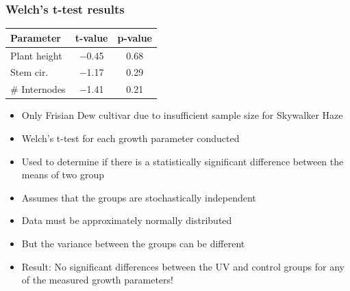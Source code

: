 \documentclass[12pt, aspectratio=1610]{beamer}
\begin{document}
    \begin{frame}
        \frametitle{Welch's t-test results}
        \footnotesize
        \begin{table}
            \begin{tabular}{lcc}
                \hline
                \hline
                \textbf{Parameter} & \textbf{t-value} & \textbf{p-value} \\
                \hline
                \hline
                Plant height & \num[mode=text]{-0.45} & \num[mode=text]{0.68} \\
                Stem cir. & \num[mode=text]{-1.17} & \num[mode=text]{0.29} \\
                \# Internodes & \num[mode=text]{-1.41} & \num[mode=text]{0.21} \\
                \hline
                \hline
            \end{tabular}
        \end{table}
        \begin{itemize}
            \item Only Frisian Dew cultivar due to insufficient sample size for Skywalker Haze
            \item Welch's t-test for each growth parameter conducted
            \item Used to determine if there is a statistically significant difference between the means of two group
            \item Assumes that the groups are stochastically independent
            \item Data must be approximately normally distributed
            \item But the variance between the groups can be different
            \item Result: No significant differences between the UV and control groups for any of the measured growth parameters!
        \end{itemize}
    \end{frame}
\end{document}
